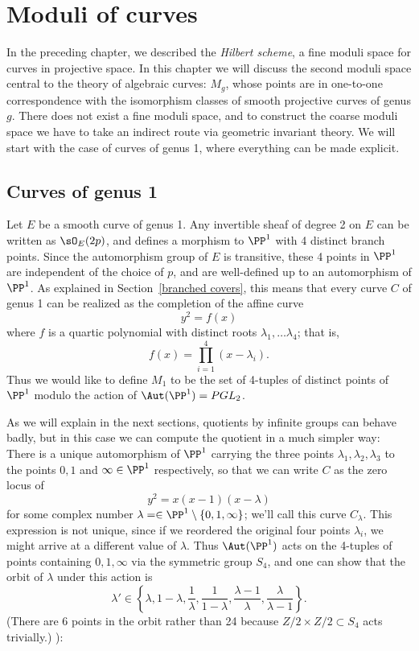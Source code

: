 


\chapter{Moduli of curves} 
\label{CurvesModuli chapter}\label{CurvesModuliChapter}


In the preceding chapter, we described the \emph{Hilbert scheme}, a fine moduli space for curves in projective space. In
this chapter we will discuss the second moduli space central to the theory of algebraic curves: $M_g$, whose points are in one-to-one correspondence with the isomorphism classes of smooth projective
curves of genus $g$. There does not exist a fine moduli space, and to construct the coarse moduli space  we have to take an indirect route via geometric invariant theory. We will start with the case of curves of genus 1, where everything can be made explicit.

\section{Curves of genus 1}

Let $E$ be a smooth curve of genus 1. Any invertible sheaf of degree 2 on $E$ can be written as
$\sO_E(2p)$, and defines
a morphism to $\PP^1$ with 4 distinct branch points. Since the automorphism group of $E$ is transitive,
these 4 points in $\PP^1$ are independent of the choice of $p$, and are well-defined
up to an automorphism of $\PP^1$.    As explained in Section~\ref{branched covers},  this means that every curve $C$ of genus 1 can be realized as the completion of the affine curve
$$
y^2 = f(x)
$$
where $f$ is a quartic polynomial with distinct roots $\lambda_1, \dots \lambda_4$; that is, 
$$
f(x) = \prod_{i=1}^4 (x - \lambda_i).
$$
Thus we would like to define $M_1$ to be the set of 4-tuples of distinct points of $\PP^1$ modulo the action of $\Aut(\PP^1) = PGL_2$.

As we will explain in the next sections, quotients by infinite groups can behave badly,
but in this case we can compute the quotient in a much simpler way:
There is a unique automorphism of $\PP^1$ carrying the three points $\lambda_1, \lambda_2,\lambda_3$ to the points $0, 1$ and $\infty \in \PP^1$ respectively, so that we can write $C$ as the zero locus of
$$
y^2 = x(x-1)(x-\lambda)
$$
for some complex number $\lambda = \in \PP^1 \setminus \{0,1,\infty\}$; we'll call this curve $C_\lambda$. 
This expression is not unique, since if we reordered the original  four points $\lambda_i$, we might arrive at a different value of $\lambda$. Thus $\Aut(\PP^1)$ acts on the 4-tuples 
of points containing $0,1,\infty$ via the symmetric group $S_4$,
and one can show that the orbit of $\lambda$ under this action is
$$
\lambda' \in \left\{ \lambda, 1-\lambda, \frac{1}{\lambda}, \frac{1}{1-\lambda}, \frac{\lambda-1}{\lambda}, \frac{\lambda}{\lambda - 1} \right\}.
$$
(There are 6 points in the orbit rather than 24 because
$Z/2\times Z/2 \subset S_4$ acts trivially.) ): 

